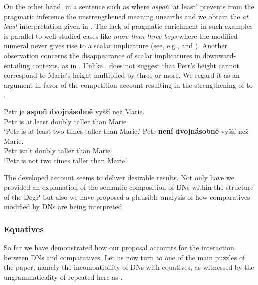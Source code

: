 \documentclass[output=paper,modfonts,hidelinks,newtxmath
\ChapterDOI{10.5281/zenodo.2545513}
]{langscibook}
\begin{document}
\noindent On the other hand, in a sentence such as  where \textit{aspoň} `at least' prevents from the pragmatic inference the unstrengthened meaning unearths and we obtain the \textit{at least} interpretation given in . The lack of pragmatic enrichment in such examples is parallel to well-studied cases like \textit{more than three boys} where the modified numeral never gives rise to a scalar implicature (see, e.g., \citealt{krifka_at_1999} and \citealt{schulz_pragmatic_2006}). Another observation concerns the disappearance of scalar implicatures in downward-entailing contexts, as in . Unlike ,  does not suggest that Petr's height cannot correspond to Marie's height multiplied by three or more. We regard it as an argument in favor of the competition account resulting in the strengthening of  to .

\ea \ea \gll\label{aspon}Petr je \textbf{aspoň} \textbf{dvojnásobně} vyšší než Marie.\label{comp-at-least}\\
Petr is at.least doubly taller than Marie\\
\glt `Petr is at least two times taller than Marie.'
\ex \gll \label{neni}Petr \textbf{není} \textbf{dvojnásobně} vyšší než Marie.\\
Petr isn't doubly taller than Marie\\
\glt `Petr is not two times taller than Marie.'
\z \z

\noindent The developed account seems to deliver desirable results. Not only have we provided an explanation of the semantic composition of DNs within the structure of the DegP but also we have proposed a plausible analysis of how comparatives modified by DNs are being interpreted.

\subsubsection{Equatives}\label{equatives}

So far we have demonstrated how our proposal accounts for the interaction between DNs and comparatives. Let us now turn to one of the main puzzles of the paper, namely the incompatibility of DNs with equatives, as witnessed by the ungrammaticality of  repeated here as .

\z
\end{document}
